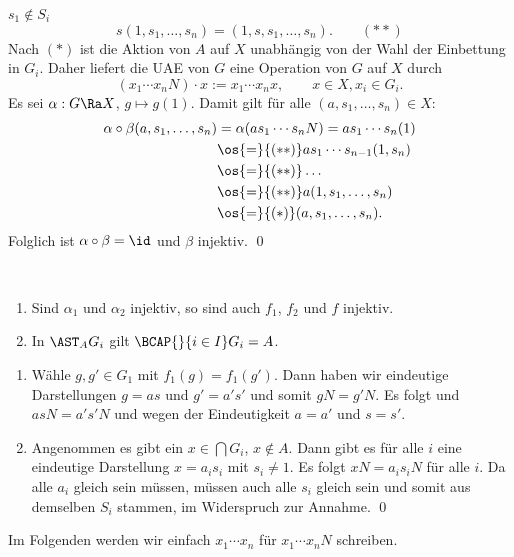 $s_1\not\in S_i$
\[
s(1,s_1,\ldots,s_n) = (1,s,s_1,\ldots,s_n). \qquad (**)
\]
Nach $(*)$ ist die Aktion von $A$ auf $X$ unabhängig von der Wahl
der Einbettung in $G_i$. Daher liefert die UAE von $G$ eine
Operation von $G$ auf $X$ durch
\[
(x_1\cdots x_n N)\cdot x := x_1\cdots x_n x,\qquad x\in X, x_i\in G_i.
\]
Es sei $\alpha:G\Ra X$, $g\mapsto g (1)$.
Damit gilt für alle $(a,s_1,\ldots,s_n)\in X$:
\begin{align*}
\alpha\circ\beta(a,s_1,\ldots,s_n)
&= \alpha(a s_1\cdots s_n N) = a s_1\cdots s_n (1) \\
&\os{=}{(**)} a s_1\cdots s_{n-1}(1,s_n) \\
&\os{=}{(**)} \ldots \\
&\os{=}{(**)} a(1,s_1,\ldots,s_n) \\
&\os{=}{(*)} (a,s_1,\ldots,s_n).
\end{align*}
Folglich ist $\alpha\circ\beta=\id$ und $\beta$ injektiv.
\qed

\FOLG\
\begin{enumerate}
\item Sind $\alpha_1$ und $\alpha_2$ injektiv, so sind auch
$f_1$, $f_2$ und $f$ injektiv.
\item In $\AST_{A} G_i$ gilt $\BCAP{}{i\in I} G_i = A$.
\end{enumerate}
\bew
\begin{enumerate}
\item Wähle $g,g'\in G_1$ mit $f_1(g)=f_1(g')$.
Dann haben wir eindeutige Darstellungen $g=as$ und $g'=a's'$
und somit $gN=g'N$. Es folgt und $asN=a's'N$ und wegen der
Eindeutigkeit $a=a'$ und $s=s'$.
\item Angenommen es gibt ein $x\in \bigcap G_i$, $x\not\in A$.
Dann gibt es für alle $i$ eine eindeutige Darstellung
$x=a_i s_i$ mit $s_i\neq 1$.
Es folgt $xN=a_i s_i N$ für alle $i$.
Da alle $a_i$ gleich sein müssen, müssen auch alle $s_i$ gleich sein
und somit aus demselben $S_i$ stammen, im Widerspruch zur Annahme.
\qed
\end{enumerate}

Im Folgenden werden wir einfach $x_1\cdots x_n$ für
$x_1\cdots x_n N$ schreiben.


